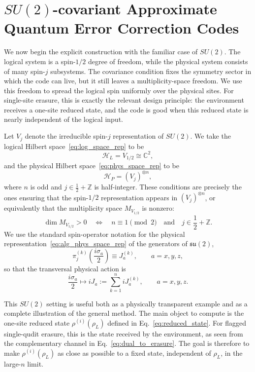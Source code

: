 \documentclass[10pt,twocolumn,superscriptaddress,aps,amsmath,amssymb,citeautoscript,floatfix,prx,longbibliography]{revtex4-2}
\newcounter{alg}
\theoremstyle{plain}
\theoremstyle{plain}
\theoremstyle{plain}
\theoremstyle{plain}
\theoremstyle{plain}
\theoremstyle{plain}
\begin{document}
\section{\texorpdfstring{$SU(2)$}{SU(2)}-covariant Approximate Quantum Error Correction Codes}\label{sec:main_su2}

We now begin the explicit construction with the familiar case of $SU(2)$. The logical system is a spin-$1/2$ degree of freedom, while the physical system consists of many spin-$j$ subsystems. The covariance condition fixes the symmetry sector in which the code can live, but it still leaves a multiplicity-space freedom. We use this freedom to spread the logical spin uniformly over the physical sites. For single-site erasure, this is exactly the relevant design principle: the environment receives a one-site reduced state, and the code is good when this reduced state is nearly independent of the logical input.

Let $V_j$ denote the irreducible spin-$j$ representation of $SU(2)$. We take the logical Hilbert space~\eqref{eq:log_space_rep} to be
\[
    \mathcal H_L = V_{1/2}\cong \mathbb C^2,
\]
and the physical Hilbert space~\eqref{eq:phys_space_rep} to be
\[
    \mathcal H_P = (V_j)^{\otimes n},
\]
where $n$ is odd and $j\in \frac12+\mathbb Z$ is half-integer. These conditions are precisely the ones ensuring that the spin-$1/2$ representation appears in $(V_j)^{\otimes n}$, or equivalently that the multiplicity space $M_{V_{1/2}}$ is nonzero:
\[
    \dim M_{V_{1/2}}>0
    \quad\Longleftrightarrow\quad
    n\equiv 1 \pmod 2
    \quad\text{and}\quad
    j\in \frac12+\mathbb Z .
\]
We use the standard spin-operator notation for the physical representation~\eqref{eq:alg_phys_space_rep} of the generators of $\mathfrak{su}(2)$,
\[
    \pi_j^{(k)}\left(\frac{i\sigma_a}{2}\right)
    \equiv J_a^{(k)},
    \qquad a=x,y,z,
\]
so that the transversal physical action is
\begin{equation}\label{eq:su2_cov_rep}
    \frac{i\sigma_a}{2}
    \longmapsto
    iJ_a
    :=
    \sum_{k=1}^n iJ_a^{(k)},
    \qquad a=x,y,z .
\end{equation}

This $SU(2)$ setting is useful both as a physically transparent example and as a complete illustration of the general method. The main object to compute is the one-site reduced state
$\rho^{(i)}(\rho_L)$ defined in Eq.~\eqref{eq:reduced_state}. For flagged single-qudit erasure, this is the state received by the environment, as seen from the complementary channel in Eq.~\eqref{eq:dual_to_erasure}. The goal is therefore to make $\rho^{(i)}(\rho_L)$ as close as possible to a fixed state, independent of $\rho_L$, in the large-$n$ limit. 
\end{document}
